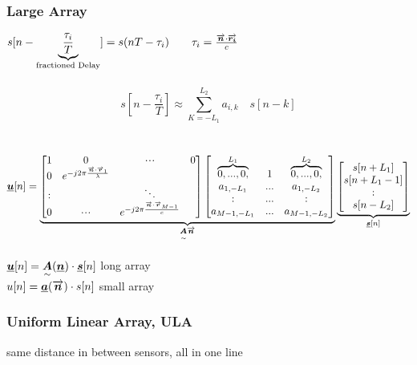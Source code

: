 \subsubsection{Large Array}
\begin{doublespace}
$s[n-\underbrace{\frac{\tau_i}{T}}_{\text{fractioned Delay}}]= s(nT-\tau_i)\qquad \tau_i=\frac{\overrightarrow{\boldsymbol {n}}\cdot\overrightarrow{\boldsymbol {r_i}}}{c}$\\ \\
\[ s[n-\frac{\tau_i}{T}]\approx  \sum_{K=-L_1}^{L_2} a_{i,k}  \quad s[n-k]\]\\ \\
$\vec{u}[n]= \underbrace{ \begin{bmatrix}1&0&\shdots&0\\0&e^{-j2\pi \frac{\vecp{n}\cdot\vecp{r}_1}{\lambda}} \\\svdots& &\ddots&\\ 0 & \shdots &e^{-j2\pi \frac{\vecp{n}\cdot\vecp{r}_{M-1}}{c}} \end{bmatrix} 
\begin{bmatrix}\overbrace{0,...,0,}^{L_1} & 1 & \overbrace{0,...,0,}^{L_2} \\ a_{1,-L_1} & ... & a_{1,-L_2}\\ \svdots & ... & \svdots \\ a_{M-1,-L_1}& ... &a_{M-1,-L_2}\end{bmatrix}}_{\ma{A}\vecp{n}} \underbrace{\begin{bmatrix}s[n+L_1]\\ s[n+L_1-1] \\\svdots \\ s[n-L_2] \end{bmatrix}}_{\vec{s}[n]}$ \\ \ \\
$\underline{\boldsymbol {u}}[n]= \underset{\sim}{\boldsymbol {A}}(\underline{\boldsymbol {n}}) \cdot\underline{\boldsymbol {s}}[n]$ \pfeil long array\\
$u[n] = \underline{\boldsymbol {a}}(\overrightarrow{\boldsymbol {n}})\cdot s[n]$ \pfeil small array\\
\end{doublespace}

\subsubsection{Uniform Linear Array, ULA}
same distance in between sensors, all in one line\\

